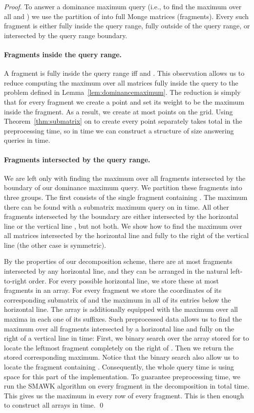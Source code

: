 \documentclass{llncs}
\begin{document}
\begin{proof}
To answer a dominance maximum query (i.e., to find the maximum  over all  and ) we use the partition of  into full Monge matrices (fragments). Every such fragment
is either fully inside the query range, fully outside of the query range, or intersected by the query range boundary. 

\paragraph{\bf Fragments inside the query range.}
A fragment  is fully inside the query range iff
 and . This observation allows us to reduce computing the maximum
over all matrices fully inside the query to the problem defined in Lemma~\ref{lem:dominancemaximum}.
The reduction is simply that for every fragment  we create
a point  and set its weight to be the maximum inside the fragment. As a result, we
create at most  points on the  grid. 
Using Theorem~\ref{thm:submatrix} on  to create every point separately 
takes total  in the preprocessing time, so in  time
we can construct a structure of size  answering queries in  time.

\paragraph{\bf Fragments intersected by the query range.}
We are left only with finding the maximum over all fragments intersected by the boundary of our dominance
maximum query. We partition these fragments into three groups. The first consists of the single fragment
containing . The maximum there can be found with a submatrix maximum query
on  in  time.
All other fragments intersected by the boundary are either intersected by the horizontal line 
or the vertical line , but not both. We show how to find the maximum over all matrices intersected by the horizontal
line  and fully to the right of the vertical line  (the other case is symmetric). 

By the properties of our decomposition
scheme, there are at most  fragments intersected by any horizontal line, and
they can be arranged in the natural left-to-right order. For every possible horizontal line,
we store these at most  fragments in an array. For every fragment we store the coordinates
of its corresponding submatrix of  and the maximum in all of its entries below the horizontal
line. The array is additionally equipped with the maximum over all maxima in each one of its suffixes.
Such preprocessed data allows us to find the maximum over all fragments intersected by
a horizontal line  and fully on the right of a vertical line  in  time:
First, we binary search over the array stored for  to locate the leftmost fragment completely on
the right of . Then we return the stored corresponding maximum. Notice that
the binary search also allow us to locate the fragment containing . Consequently,
the whole query time is  using  space for this part
of the implementation. To guarantee  preprocessing time, we  run the 
SMAWK algorithm on every fragment in the decomposition in total  time. This gives us the maximum in every row of every fragment. This is then enough to construct all arrays in  time.
\qed \end{proof}
\end{document}
